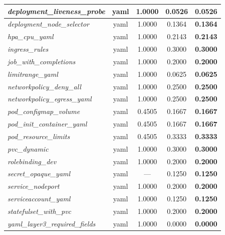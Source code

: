 \begin{footnotesize}
\begin{longtable}{|p{3.6cm}|c|c|c|c|}
\hline
\textit{deployment\_\allowbreak{}liveness\_\allowbreak{}probe} & yaml & 1.0000 & 0.0526 & \textbf{0.0526} \\
\hline
\textit{deployment\_\allowbreak{}node\_\allowbreak{}selector} & yaml & 1.0000 & 0.1364 & \textbf{0.1364} \\
\hline
\textit{hpa\_\allowbreak{}cpu\_\allowbreak{}yaml} & yaml & 1.0000 & 0.2143 & \textbf{0.2143} \\
\hline
\textit{ingress\_\allowbreak{}rules} & yaml & 1.0000 & 0.3000 & \textbf{0.3000} \\
\hline
\textit{job\_\allowbreak{}with\_\allowbreak{}completions} & yaml & 1.0000 & 0.2000 & \textbf{0.2000} \\
\hline
\textit{limitrange\_\allowbreak{}yaml} & yaml & 1.0000 & 0.0625 & \textbf{0.0625} \\
\hline
\textit{networkpolicy\_\allowbreak{}deny\_\allowbreak{}all} & yaml & 1.0000 & 0.2500 & \textbf{0.2500} \\
\hline
\textit{networkpolicy\_\allowbreak{}egress\_\allowbreak{}yaml} & yaml & 1.0000 & 0.2500 & \textbf{0.2500} \\
\hline
\textit{pod\_\allowbreak{}configmap\_\allowbreak{}volume} & yaml & 0.4505 & 0.1667 & \textbf{0.1667} \\
\hline
\textit{pod\_\allowbreak{}init\_\allowbreak{}container\_\allowbreak{}yaml} & yaml & 0.4505 & 0.1667 & \textbf{0.1667} \\
\hline
\textit{pod\_\allowbreak{}resource\_\allowbreak{}limits} & yaml & 0.4505 & 0.3333 & \textbf{0.3333} \\
\hline
\textit{pvc\_\allowbreak{}dynamic} & yaml & 1.0000 & 0.3000 & \textbf{0.3000} \\
\hline
\textit{rolebinding\_\allowbreak{}dev} & yaml & 1.0000 & 0.2000 & \textbf{0.2000} \\
\hline
\textit{secret\_\allowbreak{}opaque\_\allowbreak{}yaml} & yaml & --- & 0.1250 & \textbf{0.1250} \\
\hline
\textit{service\_\allowbreak{}nodeport} & yaml & 1.0000 & 0.2000 & \textbf{0.2000} \\
\hline
\textit{serviceaccount\_\allowbreak{}yaml} & yaml & 1.0000 & 0.1250 & \textbf{0.1250} \\
\hline
\textit{statefulset\_\allowbreak{}with\_\allowbreak{}pvc} & yaml & 1.0000 & 0.2000 & \textbf{0.2000} \\
\hline
\textit{yaml\_\allowbreak{}layer3\_\allowbreak{}required\_\allowbreak{}fields} & yaml & 1.0000 & 0.0000 & \textbf{0.0000} \\
\hline
\end{longtable}
\end{footnotesize}